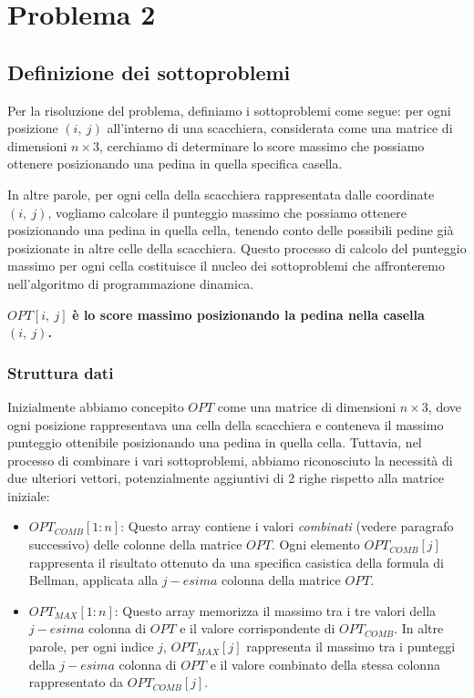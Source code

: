 \section{Problema 2}

\subsection{Definizione dei sottoproblemi}

Per la risoluzione del problema, definiamo i sottoproblemi come segue: per ogni posizione $(i,\ j)$ all'interno di una scacchiera, 
considerata come una matrice di dimensioni $n \times 3$, cerchiamo di determinare lo score massimo che possiamo ottenere posizionando 
una pedina in quella specifica casella.
\newline

In altre parole, per ogni cella della scacchiera rappresentata dalle coordinate $(i,\ j)$, vogliamo calcolare 
il punteggio massimo che possiamo ottenere posizionando una pedina in quella cella, tenendo conto delle possibili pedine 
già posizionate in altre celle della scacchiera. Questo processo di calcolo del punteggio massimo per ogni cella 
costituisce il nucleo dei sottoproblemi che affronteremo nell'algoritmo di programmazione dinamica.

\begin{center}
    $OPT[i,\ j]$ \bf{è lo score massimo posizionando la pedina nella casella} $(i,\ j)$.
\end{center}

\subsubsection*{Struttura dati}

Inizialmente abbiamo concepito $OPT$ come una matrice di dimensioni $n \times 3$, dove ogni posizione rappresentava una cella 
della scacchiera e conteneva il massimo punteggio ottenibile posizionando una pedina in quella cella. 
Tuttavia, nel processo di combinare i vari sottoproblemi, abbiamo riconosciuto la necessità di due ulteriori vettori, 
potenzialmente aggiuntivi di 2 righe rispetto alla matrice iniziale:

\begin{itemize}
    \item $OPT_{COMB}[1:n]$: Questo array contiene i valori \textit{combinati} (vedere paragrafo successivo) 
    delle colonne della matrice $OPT$. Ogni elemento $OPT_{COMB}[j]$ rappresenta il
    risultato ottenuto da una specifica casistica della formula di Bellman,
    applicata alla $j-esima$ colonna della matrice $OPT$.
    \item $OPT_{MAX}[1:n]$: Questo array memorizza il massimo tra i tre valori della $j-esima$
    colonna di $OPT$ e il valore corrispondente di $OPT_{COMB}$. In altre parole,
    per ogni indice $j$, $OPT_{MAX}[j]$ rappresenta il massimo tra i punteggi della $j-esima$
    colonna di $OPT$ e il valore combinato della stessa colonna rappresentato da $OPT_{COMB}[j]$.
\end{itemize}

